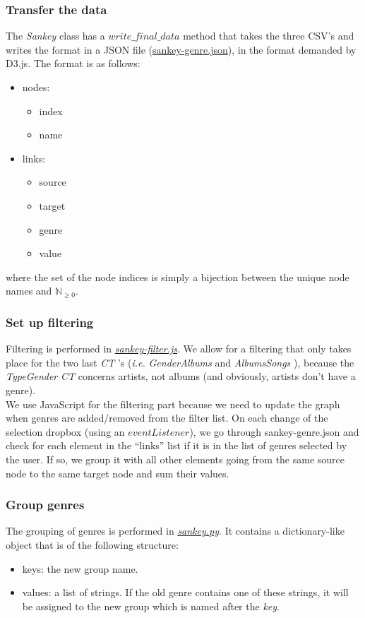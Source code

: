 \documentclass{article}
\newcommand{\N}{\mathbb{N}}
\newcommand{\ie}{\textit{i.e. }}
\newcommand{\tg}{\textit{TypeGender }}
\newcommand{\ga}{\textit{GenderAlbums }}
\newcommand{\as}{\textit{AlbumsSongs }}
\newcommand{\sk}{\textit{Sankey }}
\newcommand{\ct}{\textit{CT }}
\begin{document}
\subsubsection{Transfer the data}
The \sk class has a \(write\_final\_data\) method that takes the three CSV's and writes the format in a JSON file (\href{https://github.com/jorislimonier/collab-viz/blob/main/joris/sankey-genre.json}{sankey-genre.json}), in the format demanded by D3.js. The format is as follows:
\begin{itemize}
    \item nodes:
          \begin{itemize}
              \item index
              \item name
          \end{itemize}
    \item links:
          \begin{itemize}
              \item source
              \item target
              \item genre
              \item value
          \end{itemize}
\end{itemize}
where the set of the node indices is simply a bijection between the unique node names and \(\N_{\geq 0}\).

\subsubsection{Set up filtering}
Filtering is performed in \href{https://github.com/jorislimonier/collab-viz/blob/main/joris/sankey-filter.js}{\textit{sankey-filter.js}}. We allow for a filtering that only takes place for the two last \ct's (\ie \ga and \as), because the \tg \ct concerns artists, not albums (and obviously, artists don't have a genre). \\
We use JavaScript for the filtering part because we need to update the graph when genres are added/removed from the filter list. On each change of the selection dropbox (using an \(eventListener\)), we go through sankey-genre.json and check for each element in the ``links'' list if it is in the list of genres selected by the user. If so, we group it with all other elements going from the same source node to the same target node and sum their values.

\subsubsection{Group genres}
The grouping of genres is performed in \href{https://github.com/jorislimonier/collab-viz/blob/main/joris/src/sankey.py}{\textit{sankey.py}}. It contains a dictionary-like object that is of the following structure:
\begin{itemize}
    \item keys: the new group name.
    \item values: a list of strings. If the old genre contains one of these strings, it will be assigned to the new group which is named after the \textit{key}.
\end{itemize}
\end{document}
